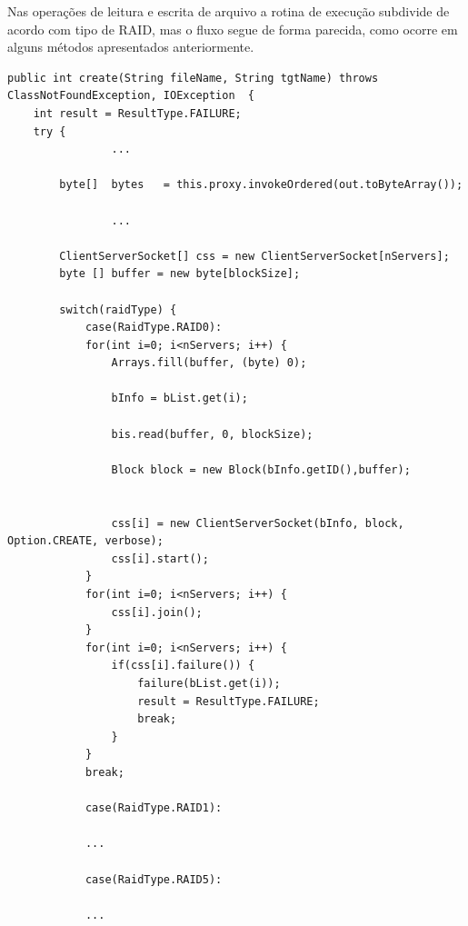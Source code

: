 Nas operações de leitura e escrita de arquivo a rotina de execução subdivide de acordo com tipo de RAID, mas o fluxo segue de forma parecida, como ocorre em alguns métodos apresentados anteriormente.
\begin{lstlisting}[basicstyle=\ttfamily\footnotesize, frame=single]	
public int create(String fileName, String tgtName) throws ClassNotFoundException, IOException  {
	int result = ResultType.FAILURE;
	try {
				...
		
		byte[]  bytes   = this.proxy.invokeOrdered(out.toByteArray());
		
				...
				
		ClientServerSocket[] css = new ClientServerSocket[nServers];
		byte [] buffer = new byte[blockSize];
		
		switch(raidType) {
			case(RaidType.RAID0):
			for(int i=0; i<nServers; i++) {
				Arrays.fill(buffer, (byte) 0);
				
				bInfo = bList.get(i);
				
				bis.read(buffer, 0, blockSize);
				
				Block block = new Block(bInfo.getID(),buffer);
				
				
				css[i] = new ClientServerSocket(bInfo, block, Option.CREATE, verbose);
				css[i].start();   
			}
			for(int i=0; i<nServers; i++) {
				css[i].join();
			}
			for(int i=0; i<nServers; i++) {
				if(css[i].failure()) {
					failure(bList.get(i));
					result = ResultType.FAILURE;
					break;
				}
			}
			break;
			
			case(RaidType.RAID1):
					
			...
			
			case(RaidType.RAID5):
			
			...
			
\end{lstlisting}